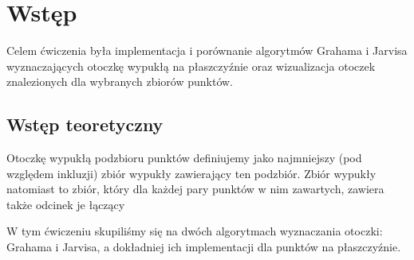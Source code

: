 \documentclass[11pt,a4paper]{article}
\begin{document}
\section{Wstęp}
Celem ćwiczenia była implementacja i porównanie 
algorytmów Grahama i Jarvisa wyznaczających otoczkę wypukłą 
na płaszczyźnie oraz wizualizacja otoczek znalezionych
dla wybranych zbiorów punktów.

\subsection{Wstęp teoretyczny}
Otoczkę wypukłą podzbioru punktów definiujemy 
jako najmniejszy (pod względem inkluzji) zbiór wypukły
zawierający ten podzbiór. Zbiór wypukły natomiast to
zbiór, który dla każdej pary punktów w nim zawartych, 
zawiera także odcinek je łączący

W tym ćwiczeniu skupiliśmy się na dwóch algorytmach
wyznaczania otoczki: Grahama i Jarvisa, a dokładniej
ich implementacji dla punktów na płaszczyźnie.
\end{document}
